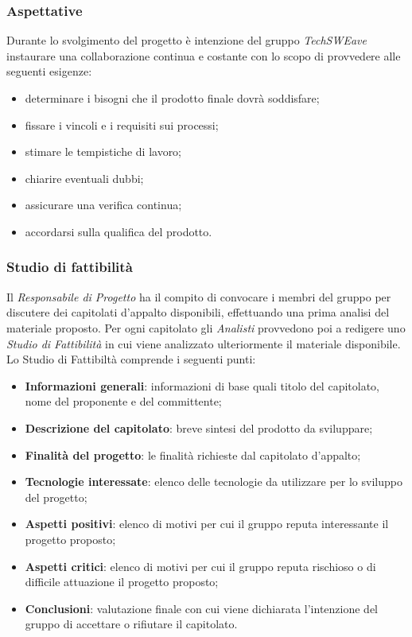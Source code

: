 \subsubsection{Aspettative}
Durante lo svolgimento del progetto è intenzione del gruppo \textit{TechSWEave} instaurare una collaborazione continua e costante con lo scopo di provvedere alle seguenti esigenze:
\begin{itemize}
    \item determinare i bisogni che il prodotto finale dovrà soddisfare;
    \item fissare i vincoli e i requisiti sui processi;
    \item stimare le tempistiche di lavoro;
    \item chiarire eventuali dubbi;
    \item assicurare una verifica continua;
    \item accordarsi sulla qualifica del prodotto.
\end{itemize}
\subsubsection{Studio di fattibilità}
Il \textit{Responsabile di Progetto} ha il compito di convocare i membri del gruppo per discutere dei capitolati d’appalto disponibili, effettuando una prima analisi del materiale proposto. Per ogni capitolato gli \textit{Analisti} provvedono poi a redigere uno \textit{Studio di Fattibilità} in cui viene analizzato ulteriormente il materiale disponibile.
\\Lo Studio di Fattibiltà comprende i seguenti punti:
\begin{itemize}
    \item \textbf{Informazioni generali}: informazioni di base quali titolo del capitolato, nome del proponente e del committente;
    \item \textbf{Descrizione del capitolato}: breve sintesi del prodotto da sviluppare;
    \item \textbf{Finalità del progetto}: le finalità richieste dal capitolato d’appalto;
    \item \textbf{Tecnologie interessate}: elenco delle tecnologie da utilizzare per lo sviluppo del progetto;
    \item \textbf{Aspetti positivi}: elenco di motivi per cui il gruppo reputa interessante il progetto proposto; 
    \item \textbf{Aspetti critici}: elenco di motivi per cui il gruppo reputa rischioso o di difficile attuazione il progetto proposto;
    \item \textbf{Conclusioni}: valutazione finale con cui viene dichiarata l’intenzione del gruppo di accettare o rifiutare il capitolato.
\end{itemize}
